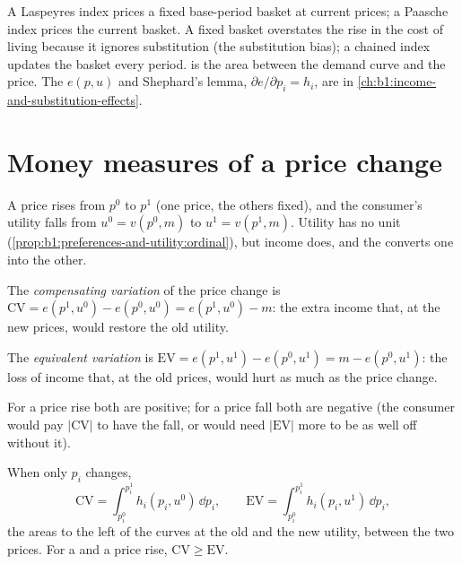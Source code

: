 \begin{recall}
A Laspeyres index prices a fixed base-period basket at current prices; a
Paasche index prices the current basket. A fixed basket overstates the rise
in the cost of living because it ignores substitution (the substitution
bias); a chained index updates the basket every period.  is
the area between the demand curve and the price. The 
$e(p, u)$ and Shephard's lemma, $\partial e/\partial p_i = h_i$, are in
\cref{ch:b1:income-and-substitution-effects}.
\end{recall}

\section{Money measures of a price change}\label{sec:b1:consumer-welfare:cv-ev}

A price rises from $p^0$ to $p^1$ (one price, the others fixed), and the
consumer's utility falls from $u^0 = v(p^0, m)$ to $u^1 = v(p^1, m)$. Utility
has no unit (\cref{prop:b1:preferences-and-utility:ordinal}), but income
does, and the  converts one into the other.

\begin{definition}\label{def:b1:consumer-welfare:cv}
The \emph{compensating variation} of the price change is
$\mathrm{CV} = e(p^1, u^0) - e(p^0, u^0) = e(p^1, u^0) - m$: the extra income that,
at the new prices, would restore the old utility.
\end{definition}

\begin{definition}\label{def:b1:consumer-welfare:ev}
The \emph{equivalent variation} is
$\mathrm{EV} = e(p^1, u^1) - e(p^0, u^1) = m - e(p^0, u^1)$: the loss of income
that, at the old prices, would hurt as much as the price change.
\end{definition}

For a price rise both are positive; for a price fall both are negative
(the consumer would pay $|\mathrm{CV}|$ to have the fall, or would need
$|\mathrm{EV}|$ more to be as well off without it).

\begin{proposition}\label{prop:b1:consumer-welfare:areas}
When only $p_i$ changes,
\[
\mathrm{CV} = \int_{p_i^0}^{p_i^1} h_i(p_i, u^0)\,\dd p_i ,\qquad
\mathrm{EV} = \int_{p_i^0}^{p_i^1} h_i(p_i, u^1)\,\dd p_i ,
\]
the areas to the left of the  curves at the old and the
new utility, between the two prices. For a  and a price rise,
$\mathrm{CV} \ge \mathrm{EV}$.
\end{proposition}

